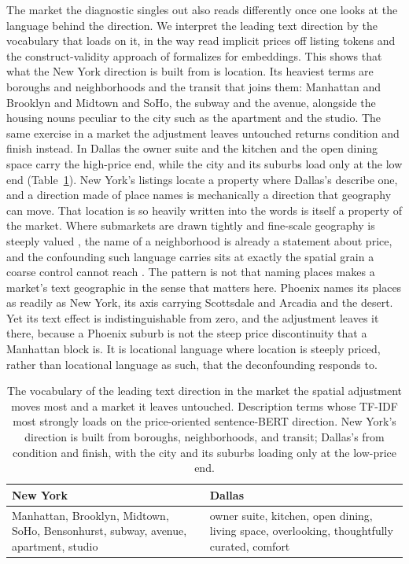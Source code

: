 The market the diagnostic singles out also reads differently once one looks at the
language behind the direction. We interpret the leading text direction by the
vocabulary that loads on it, in the way \citet{nowak2017textual} read implicit
prices off listing tokens and the construct-validity approach of
\citet{fang2022construct} formalizes for embeddings. This shows that what the New York
direction is built from is location. Its heaviest terms are boroughs and
neighborhoods and the transit that joins them: Manhattan and Brooklyn and Midtown
and SoHo, the subway and the avenue, alongside the housing nouns peculiar to the
city such as the apartment and the studio. The same exercise in a market the
adjustment leaves untouched returns condition and finish instead. In Dallas
the owner suite and the kitchen and the open dining space carry the high-price end,
while the city and its suburbs load only at the low end (Table~\ref{tab:nyc-vocab}). New York's listings locate
a property where Dallas's describe one, and a direction made of place names is
mechanically a direction that geography can move. That location is so heavily
written into the words is itself a property of the market. Where submarkets
are drawn tightly and fine-scale geography is steeply valued
\citep{goodman1998housing,bourassa1999defining}, the name of a neighborhood is
already a statement about price, and the confounding such language carries sits at
exactly the spatial grain a coarse control cannot reach
\citep{paciorek2010importance,keller2020selecting}. The pattern is not that naming
places makes a market's text geographic in the sense that matters here. Phoenix
names its places as readily as New York, its axis carrying Scottsdale and Arcadia
and the desert. Yet its text effect is indistinguishable from zero, and the
adjustment leaves it there, because a Phoenix suburb is not the steep price
discontinuity that a Manhattan block is. It is locational language where location
is steeply priced, rather than locational language as such, that the deconfounding
responds to.

\begin{table}[H]
\centering
\caption{The vocabulary of the leading text direction in the market the spatial
adjustment moves most and a market it leaves untouched. Description terms whose
TF-IDF most strongly loads on the price-oriented sentence-BERT direction. New
York's direction is built from boroughs, neighborhoods, and transit; Dallas's from
condition and finish, with the city and its suburbs loading only at the low-price
end.}
\label{tab:nyc-vocab}
\small
\begin{tabular}{p{}p{}}
\toprule
New York & Dallas \\
\midrule
Manhattan, Brooklyn, Midtown, SoHo, Bensonhurst, subway, avenue, apartment, studio
& owner suite, kitchen, open dining, living space, overlooking, thoughtfully
curated, comfort \\
\bottomrule
\end{tabular}
\end{table}

